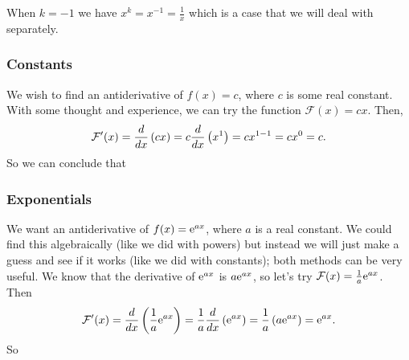   	\bigskip
	
	\hfil{}
	\bigskip
	\bigskip
	
\noindent When $k = -1$ we have $x^k = x^{-1} = \frac{1}{x}$ which is a case that we will deal with separately.

\subsubsection{Constants}
We wish to find an antiderivative of $f(x) = c$, where $c$ is some real constant. With some thought and experience, we can try the function $\mathcal{F}(x) = cx$. Then,
\[
\mathcal{F}'(x) = \frac{d}{dx}\left(cx\right) = c\frac{d}{dx}\left(x^1\right) = cx^{1-1} = cx^0 = c.
\]
So we can conclude that
%

  	\bigskip
	
	\hfil{}
	\bigskip
	\bigskip

\subsubsection{Exponentials}
We want an antiderivative of $f(x) = \mathrm{e}^{ax}$, where $a$ is a real constant. We could find this algebraically (like we did with powers) but instead we will just make a guess and see if it works (like we did with constants); both methods can be very useful. We know that the derivative of $\mathrm{e}^{ax}$ is $a\mathrm{e}^{ax}$, so let's try $\mathcal{F}(x) = \frac{1}{a}\mathrm{e}^{ax}$. Then
\[
\mathcal{F}'(x) = \frac{d}{dx}\left(\frac{1}{a}\mathrm{e}^{ax}\right) = \frac{1}{a}\frac{d}{dx}\left(\mathrm{e}^{ax}\right) = \frac{1}{a}\left(a\mathrm{e}^{ax}\right) = \mathrm{e}^{ax}.
\]
So

